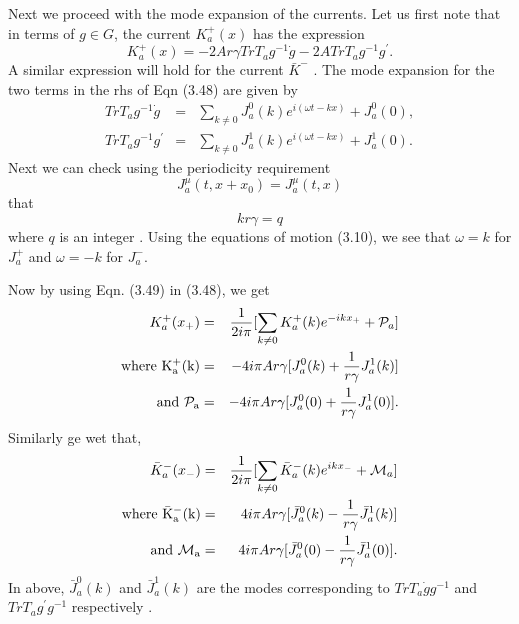 \documentclass[a4paper,12pt]{article}
\begin{document}
Next we proceed with the mode expansion of the currents. Let us first note
that in terms of $g \in G$, the current $K_{a}^{+}(x)$ has the expression 
\begin{equation}
K_{a}^{+}(x)=-2Ar{\gamma}TrT_ag^{-1}\dot{g} - 2ATrT_ag^{-1}g^{'}.
\end{equation}
A similar expression will hold for the current $\bar{K}^{-}$ . 
The mode expansion for the two terms in the rhs of Eqn (3.48) are given by
\begin{eqnarray}
TrT_ag^{-1}{\dot g}&=&\sum_{k{\neq}0}J^0_a(k)
e^{i({\omega}t - kx)} + {J^{0}_a(0)},\nonumber\\
TrT_ag^{-1}g^{'}&=&\sum_{k{\neq}0}J^{1}_{a}(k)
e^{i({\omega}t - kx)} + J^1_a(0).
\end{eqnarray}
Next we
 can check using the periodicity requirement 
\begin{equation}
J^{\mu}_{a}(t,x + x_0)=J^{\mu}_{a}(t,x) 
\end{equation}
that
\begin{equation}
kr{\gamma}=q
\end{equation}
where $q$ is an integer . Using the equations of motion (3.10), we
 see that $\omega = k$ for $J^{+}_{a}$ and $\omega = -k$ for $J^{-}_{a}$. 

Now by using Eqn. (3.49) in (3.48), we get
\begin{eqnarray}
K^{+}_{a}(x_{+})&=&\frac{1}{2i{\pi}}[\sum_{k{\neq}0}K^{+}_{a}(k)e^{-ikx_{+}}+ 
{\cal P}_a]\nonumber\\
\rm{where}~
K^{+}_{a}(k)&=&-{{4i{\pi}Ar{\gamma}}}[J^{0}_{a}(k) 
+ \frac{1}{r{\gamma}}J^{1}_{a}(k)]\nonumber\\
\rm{and}~
{\cal P}_a&=&-{{4i{\pi}Ar{\gamma}}}[J^{0}_{a}(0) +
 \frac{1}{r{\gamma}}J^{1}_{a}(0)].
\end{eqnarray}
Similarly ge wet that,
\begin{eqnarray}
\bar{K}^{-}_{a}(x_{-})&=&\frac{1}{2i{\pi}}[\sum_{k{\neq}0}
\bar{K}^{-}_{a}(k)e^{ikx_{-}} 
+ {\cal M}_a]\nonumber\\
\rm{where}~
\bar{K}^{-}_a(k)&=&{{4i{\pi}Ar{\gamma}}}[\bar{J}^{0}_{a}(k)- 
\frac{1}{r{\gamma}}\bar{J}^{1}_{a}(k)]\nonumber\\
\rm{and}~
{\cal M}_a&=&{{4i{\pi}Ar{\gamma}}}[\bar{J}^{0}_{a}(0)- 
\frac{1}{r{\gamma}}\bar{J}^{1}_{a}(0)].
\end{eqnarray}
In above,
$\bar{J}^{0}_{a}(k)$ and $\bar{J}^{1}_{a}(k)$ are 
the modes corresponding  to $TrT_a{\dot g}g^{-1}$ and 
$TrT_ag^{'}g^{-1}$ respectively .
\end{document}
